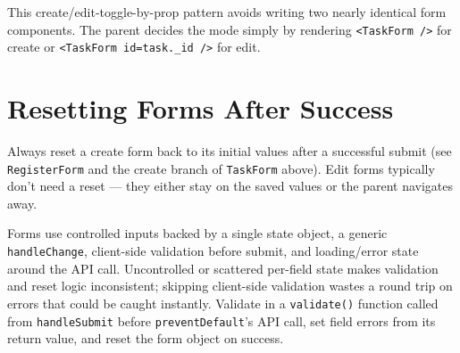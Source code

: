 \begin{tipbox}[TIP]
This create/edit-toggle-by-prop pattern avoids writing two nearly identical
form components. The parent decides the mode simply by rendering
\texttt{<TaskForm />} for create or \texttt{<TaskForm id={task.\_id} />} for
edit.
\end{tipbox}

\section{Resetting Forms After Success}

Always reset a create form back to its initial values after a successful
submit (see \texttt{RegisterForm} and the create branch of \texttt{TaskForm}
above). Edit forms typically don't need a reset --- they either stay on the
saved values or the parent navigates away.

\whatwhyhow
{Forms use controlled inputs backed by a single state object, a generic \texttt{handleChange}, client-side validation before submit, and loading/error state around the API call.}
{Uncontrolled or scattered per-field state makes validation and reset logic inconsistent; skipping client-side validation wastes a round trip on errors that could be caught instantly.}
{Validate in a \texttt{validate()} function called from \texttt{handleSubmit} before \texttt{preventDefault}'s API call, set field errors from its return value, and reset the form object on success.}
